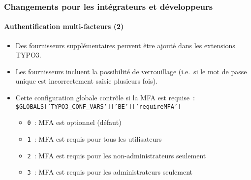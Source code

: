 %

\begin{frame}[fragile]
	\frametitle{Changements pour les intégrateurs et développeurs}
	\framesubtitle{Authentification multi-facteurs (2)}

	\begin{itemize}

		\item Des fournisseurs supplémentaires peuvent être ajouté dans les extensions TYPO3.

		\item Les fournisseurs incluent la possibilité de verrouillage
			(i.e.\ si le mot de passe unique est incorrectement saisie plusieurs fois).

		\item Cette configuration globale contrôle si la MFA est requise~:\newline
			\smaller\texttt{\$GLOBALS['TYPO3\_CONF\_VARS']['BE']['requireMFA']}\normalsize

			\begin{itemize}
				\item \texttt{0}~: MFA est optionnel (défaut)
				\item \texttt{1}~: MFA est requis pour tous les utilisateurs
				\item \texttt{2}~: MFA est requis pour les non-administrateurs seulement
				\item \texttt{3}~: MFA est requis pour les administrateurs seulement
			\end{itemize}

	\end{itemize}

\end{frame}

